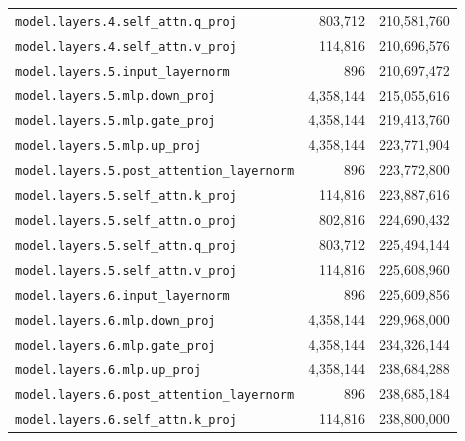 \documentclass[10pt,a4paper]{article}
\theoremstyle{definition}
\begin{document}
\begin{appendices}
\begin{longtable}{p{9.5cm}rr}
\texttt{model.\allowbreak{}layers.\allowbreak{}4.\allowbreak{}self\_attn.\allowbreak{}q\_proj} & 803,712 & 210,581,760 \\
\texttt{model.\allowbreak{}layers.\allowbreak{}4.\allowbreak{}self\_attn.\allowbreak{}v\_proj} & 114,816 & 210,696,576 \\
\texttt{model.\allowbreak{}layers.\allowbreak{}5.\allowbreak{}input\_layernorm} & 896 & 210,697,472 \\
\texttt{model.\allowbreak{}layers.\allowbreak{}5.\allowbreak{}mlp.\allowbreak{}down\_proj} & 4,358,144 & 215,055,616 \\
\texttt{model.\allowbreak{}layers.\allowbreak{}5.\allowbreak{}mlp.\allowbreak{}gate\_proj} & 4,358,144 & 219,413,760 \\
\texttt{model.\allowbreak{}layers.\allowbreak{}5.\allowbreak{}mlp.\allowbreak{}up\_proj} & 4,358,144 & 223,771,904 \\
\texttt{model.\allowbreak{}layers.\allowbreak{}5.\allowbreak{}post\_attention\_layernorm} & 896 & 223,772,800 \\
\texttt{model.\allowbreak{}layers.\allowbreak{}5.\allowbreak{}self\_attn.\allowbreak{}k\_proj} & 114,816 & 223,887,616 \\
\texttt{model.\allowbreak{}layers.\allowbreak{}5.\allowbreak{}self\_attn.\allowbreak{}o\_proj} & 802,816 & 224,690,432 \\
\texttt{model.\allowbreak{}layers.\allowbreak{}5.\allowbreak{}self\_attn.\allowbreak{}q\_proj} & 803,712 & 225,494,144 \\
\texttt{model.\allowbreak{}layers.\allowbreak{}5.\allowbreak{}self\_attn.\allowbreak{}v\_proj} & 114,816 & 225,608,960 \\
\texttt{model.\allowbreak{}layers.\allowbreak{}6.\allowbreak{}input\_layernorm} & 896 & 225,609,856 \\
\texttt{model.\allowbreak{}layers.\allowbreak{}6.\allowbreak{}mlp.\allowbreak{}down\_proj} & 4,358,144 & 229,968,000 \\
\texttt{model.\allowbreak{}layers.\allowbreak{}6.\allowbreak{}mlp.\allowbreak{}gate\_proj} & 4,358,144 & 234,326,144 \\
\texttt{model.\allowbreak{}layers.\allowbreak{}6.\allowbreak{}mlp.\allowbreak{}up\_proj} & 4,358,144 & 238,684,288 \\
\texttt{model.\allowbreak{}layers.\allowbreak{}6.\allowbreak{}post\_attention\_layernorm} & 896 & 238,685,184 \\
\texttt{model.\allowbreak{}layers.\allowbreak{}6.\allowbreak{}self\_attn.\allowbreak{}k\_proj} & 114,816 & 238,800,000 \\

\end{longtable}
\end{appendices}
\end{document}
